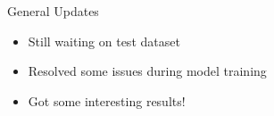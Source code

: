 \begin{frame}{General Updates}
    \begin{itemize}
        \item Still waiting on test dataset
        \item Resolved some issues during model training
        \item Got some interesting results!
    \end{itemize}    
\end{frame}







